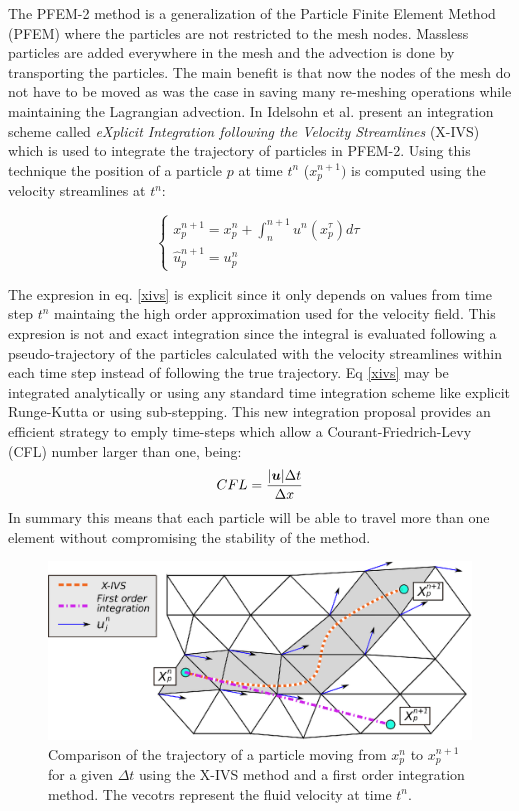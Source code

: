 The PFEM-2 method is a generalization of the Particle Finite Element Method (PFEM) \cite{sergio:pfem} where the particles are not restricted to the mesh nodes. Massless particles are added everywhere in the mesh and the advection is done by transporting the particles. The main benefit is that now the nodes of the mesh do not have to be moved as was the case in \cite{sergio:pfem} saving many re-meshing operations while maintaining the Lagrangian advection. In \cite{sergio:xivs1} Idelsohn et al. present an integration scheme called {\em eXplicit Integration following the Velocity Streamlines} (X-IVS) which is used to integrate the trajectory of particles in PFEM-2. Using this technique the position of a particle $p$ at time $t^n$ ($x_p^{n+1})$ is computed using the velocity streamlines at $t^n$:

\begin{equation}\label{xivs}
  \begin{cases}
    x_p^{n+1}=x_p^n+\int_n^{n+1} u^n(x_p^\tau) d\tau\\
    \hat{u}^{n+1}_p=u_p^n
  \end{cases}
\end{equation}

The expresion in eq. \ref{xivs} is explicit since it only depends on values from time step $t^n$ maintaing the high order approximation used for the velocity field. This expresion is not and exact integration since the integral is evaluated following a pseudo-trajectory of the particles calculated with the velocity streamlines within each time step instead of following the true trajectory. Eq \ref{xivs} may be integrated analytically or using any standard time integration scheme like explicit Runge-Kutta or using sub-stepping. This new integration proposal provides an efficient strategy to emply time-steps which allow a Courant-Friedrich-Levy (CFL) number larger than one, being:
\begin{equation}
  CFL=\frac{|\boldsymbol{u}|\Delta t}{\Delta x}
\end{equation}
In summary  this means that each particle will be able to travel more than one element without compromising the stability of the method.

\begin{figure}[htp] 
\centering 
\includegraphics[scale=.6]{./imgs/xivs.eps}
\caption{Comparison of the trajectory of a particle moving from $x_p^n$ to $x_p^{n+1}$ for a given $\Delta t$ using the X-IVS method and a first order integration method. The vecotrs represent the fluid velocity at time $t^n$.}
\label{fig:xivs}
\end{figure}

